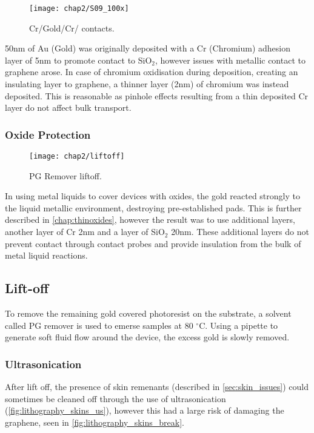 \documentclass[../../Matt_Gebert_Honours_Thesis.tex]{subfiles}
\begin{document}
	\begin{wrapfigure}[10]{r}[0pt]{7.5cm}
		\vspace{-0.5cm}
		\centering
		\texttt{[image: chap2/S09\_100x]}
		\caption[Deposition contacts]{Cr/Gold/Cr/\silicondioxide{} contacts.}\label{fig:depos_pads}
	\end{wrapfigure}
	50nm of Au (Gold) was originally deposited with a Cr (Chromium) adhesion layer of 5nm to promote contact to SiO$_2$, however issues with metallic contact to graphene arose. In case of chromium oxidisation during deposition, creating an insulating layer to graphene, a thinner layer (2nm) of chromium was instead deposited. This is reasonable as pinhole effects resulting from a thin deposited Cr layer do not affect bulk transport.
	
	\subsubsection{Oxide Protection}\label{sec:deposition_oxide_protection}
	
	\begin{wrapfigure}[13]{r}[0pt]{5.5cm}
		\vspace{-1cm}
		\centering
		\texttt{[image: chap2/liftoff]}
		\caption{PG Remover liftoff.}\label{fig:liftoff}
	\end{wrapfigure}
	In using metal liquids to cover devices with oxides, the gold reacted strongly to the liquid metallic environment, destroying pre-established pads. This is further described in \cref{chap:thinoxides}, however the result was to use additional layers, another layer of Cr 2nm and a layer of SiO$_2$ 20nm. These additional layers do not prevent contact through contact probes and provide insulation from the bulk of metal liquid reactions.
	
	\subsection{Lift-off}\label{sec:liftoff}
	To remove the remaining gold covered photoresist on the substrate, a solvent called PG remover is used to emerse samples at 80 $^\circ$C. Using a pipette to generate soft fluid flow around the device, the excess gold is slowly removed. 
	
	\subsubsection{Ultrasonication}\label{sec:ultrasonication}
	After lift off, the presence of skin remenants (described in \cref{sec:skin_issues}) could sometimes be cleaned off through the use of ultrasonication (\cref{fig:lithography_skins_us}), however this had a large risk of damaging the graphene, seen in \cref{fig:lithography_skins_break}.
	
\end{document}

